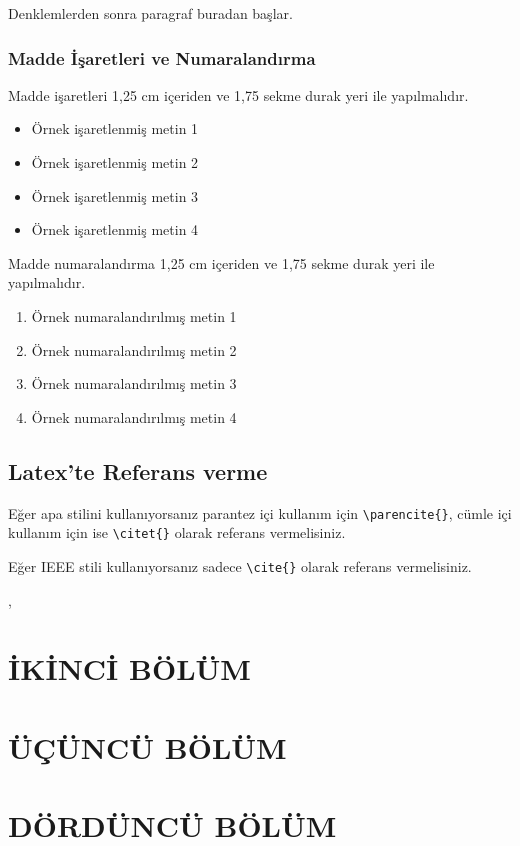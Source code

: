 \documentclass[tekyonlu,turkce,yukseklisans,karton,fenbilimleri]{tnkutez}
\begin{document}
Denklemlerden sonra paragraf buradan başlar.

\subsection{Madde İşaretleri ve Numaralandırma}
Madde işaretleri 1,25 cm içeriden ve 1,75 sekme durak yeri ile yapılmalıdır. 
\begin{itemize}
	\setlength{\itemindent}{1.25cm}
	\item Örnek işaretlenmiş metin 1
	\item Örnek işaretlenmiş metin 2
	\item Örnek işaretlenmiş metin 3
	\item Örnek işaretlenmiş metin 4
\end{itemize}

Madde numaralandırma 1,25 cm içeriden ve 1,75 sekme durak yeri ile yapılmalıdır.
\begin{enumerate}
	\setlength{\itemindent}{1.25cm}
	\item Örnek numaralandırılmış metin 1
	\item Örnek numaralandırılmış metin 2
	\item Örnek numaralandırılmış metin 3
	\item Örnek numaralandırılmış metin 4
\end{enumerate}


\section{Latex'te Referans verme}

Eğer apa stilini kullanıyorsanız parantez içi kullanım için \verb|\parencite{}|, cümle içi kullanım için ise \verb|\citet{}| olarak referans vermelisiniz.

Eğer IEEE stili kullanıyorsanız sadece \verb|\cite{}| olarak referans vermelisiniz.

\citet{Sakamoto2005}, \parencite{Sakamoto2005}
\cite{Thompson2014}

\chapter{İKİNCİ BÖLÜM}
\chapter{ÜÇÜNCÜ BÖLÜM}
\chapter{DÖRDÜNCÜ BÖLÜM}
\end{document}
